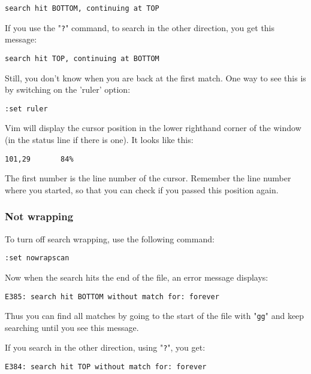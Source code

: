 \begin{Verbatim}[samepage=true]
    search hit BOTTOM, continuing at TOP 
\end{Verbatim}

If you use the "\verb!?!" command, to search in the other direction, you get this message:

\begin{Verbatim}[samepage=true]
    search hit TOP, continuing at BOTTOM 
\end{Verbatim}

Still, you don't know when you are back at the first match.
One way to see this is by switching on the 'ruler' option:

\begin{Verbatim}[samepage=true]
 :set ruler
\end{Verbatim}

Vim will display the cursor position in the lower righthand corner of the window (in the status line if there is one).
It looks like this:

\begin{Verbatim}[samepage=true]
    101,29       84% 
\end{Verbatim}

The first number is the line number of the cursor.
Remember the line number where you started, so that you can check if you passed this position again.
\subsubsection{Not wrapping}
To turn off search wrapping, use the following command:

\begin{Verbatim}[samepage=true]
 :set nowrapscan
\end{Verbatim}

Now when the search hits the end of the file, an error message displays:

\begin{Verbatim}[samepage=true]
    E385: search hit BOTTOM without match for: forever 
\end{Verbatim}

Thus you can find all matches by going to the start of the file with "\verb!gg!" and keep searching until you see this message.

If you search in the other direction, using "\verb!?!", you get:

\begin{Verbatim}[samepage=true]
    E384: search hit TOP without match for: forever 
\end{Verbatim}
